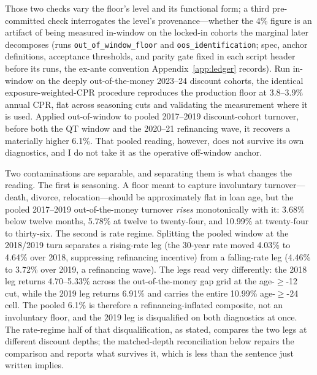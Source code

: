 \documentclass[12pt]{article}
\begin{document}
Those two checks vary the floor's level and its functional form; a third pre-committed check interrogates the level's provenance---whether the 4\% figure is an artifact of being measured in-window on the locked-in cohorts the marginal later decomposes (runs \texttt{out\_of\_window\_floor} and \texttt{oos\_identification}; spec, anchor definitions, acceptance thresholds, and parity gate fixed in each script header before its runs, the ex-ante convention Appendix~\ref{app:ledger} records). Run in-window on the deeply out-of-the-money 2023--24 discount cohorts, the identical exposure-weighted-CPR procedure reproduces the production floor at 3.8--3.9\% annual CPR, flat across seasoning cuts and validating the measurement where it is used. Applied out-of-window to pooled 2017--2019 discount-cohort turnover, before both the QT window and the 2020--21 refinancing wave, it recovers a materially higher 6.1\%. That pooled reading, however, does not survive its own diagnostics, and I do not take it as the operative off-window anchor.

Two contaminations are separable, and separating them is what changes the reading. The first is seasoning. A floor meant to capture involuntary turnover---death, divorce, relocation---should be approximately flat in loan age, but the pooled 2017--2019 out-of-the-money turnover \emph{rises} monotonically with it: 3.68\% below twelve months, 5.78\% at twelve to twenty-four, and 10.99\% at twenty-four to thirty-six. The second is rate regime. Splitting the pooled window at the 2018/2019 turn separates a rising-rate leg (the 30-year rate moved 4.03\% to 4.64\% over 2018, suppressing refinancing incentive) from a falling-rate leg (4.46\% to 3.72\% over 2019, a refinancing wave). The legs read very differently: the 2018 leg returns 4.70--5.33\% across the out-of-the-money gap grid at the age-$\geq$-12 cut, while the 2019 leg returns 6.91\% and carries the entire 10.99\% age-$\geq$-24 cell. The pooled 6.1\% is therefore a refinancing-inflated composite, not an involuntary floor, and the 2019 leg is disqualified on both diagnostics at once. The rate-regime half of that disqualification, as stated, compares the two legs at different discount depths; the matched-depth reconciliation below repairs the comparison and reports what survives it, which is less than the sentence just written implies.
\end{document}
